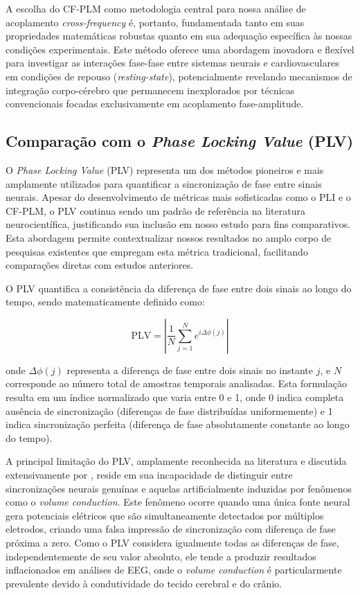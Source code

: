 A escolha do CF-PLM como metodologia central para nossa análise de acoplamento \textit{cross-frequency} é, portanto, fundamentada tanto em suas propriedades matemáticas robustas quanto em sua adequação específica às nossas condições experimentais. Este método oferece uma abordagem inovadora e flexível para investigar as interações fase-fase entre sistemas neurais e cardiovasculares em condições de repouso (\textit{resting-state}), potencialmente revelando mecanismos de integração corpo-cérebro que permanecem inexplorados por técnicas convencionais focadas exclusivamente em acoplamento fase-amplitude.


\subsection{Comparação com o \textit{Phase Locking Value} (PLV)}
O \textit{Phase Locking Value} (PLV) representa um dos métodos pioneiros e mais amplamente utilizados para quantificar a sincronização de fase entre sinais neurais. Apesar do desenvolvimento de métricas mais sofisticadas como o PLI e o CF-PLM, o PLV continua sendo um padrão de referência na literatura neurocientífica, justificando sua inclusão em nosso estudo para fins comparativos. Esta abordagem permite contextualizar nossos resultados no amplo corpo de pesquisas existentes que empregam esta métrica tradicional, facilitando comparações diretas com estudos anteriores.

O PLV quantifica a consistência da diferença de fase entre dois sinais ao longo do tempo, sendo matematicamente definido como:

\[
\text{PLV} = \left| \frac{1}{N} \sum_{j=1}^{N} e^{i\Delta\phi(j)} \right|
\]

onde \(\Delta\phi(j)\) representa a diferença de fase entre dois sinais no instante \(j\), e \(N\) corresponde ao número total de amostras temporais analisadas. Esta formulação resulta em um índice normalizado que varia entre 0 e 1, onde 0 indica completa ausência de sincronização (diferenças de fase distribuídas uniformemente) e 1 indica sincronização perfeita (diferença de fase absolutamente constante ao longo do tempo).

A principal limitação do PLV, amplamente reconhecida na literatura e discutida extensivamente por , reside em sua incapacidade de distinguir entre sincronizações neurais genuínas e aquelas artificialmente induzidas por fenômenos como o \textit{volume conduction}. Este fenômeno ocorre quando uma única fonte neural gera potenciais elétricos que são simultaneamente detectados por múltiplos eletrodos, criando uma falsa impressão de sincronização com diferença de fase próxima a zero. Como o PLV considera igualmente todas as diferenças de fase, independentemente de seu valor absoluto, ele tende a produzir resultados inflacionados em análises de EEG, onde o \textit{volume conduction} é particularmente prevalente devido à condutividade do tecido cerebral e do crânio.

